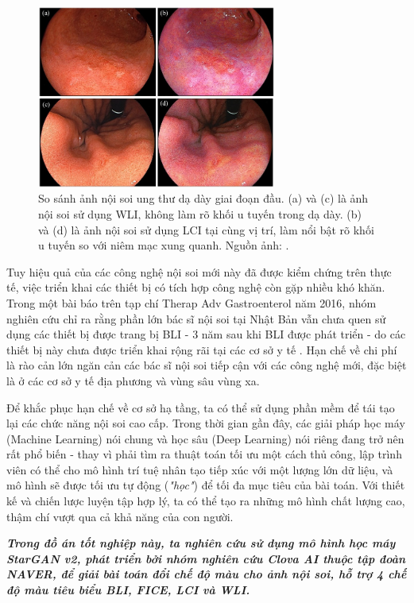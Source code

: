 \documentclass[12pt]{extreport}
\begin{document}
\begin{figure}[H]
    \centering
    \includegraphics[width=0.7\textwidth]{figure1}
    \caption{So sánh ảnh nội soi ung thư dạ dày giai đoạn đầu. (a) và (c) là ảnh nội soi sử dụng WLI, không làm rõ khối u tuyến trong dạ dày. (b) và (d) là ảnh nội soi sử dụng LCI tại cùng vị trí, làm nổi bật rõ khối u tuyến so với niêm mạc xung quanh. Nguồn ảnh: \cite{pmid31700545}.}
    \label{wli-lci}
\end{figure}

Tuy hiệu quả của các công nghệ nội soi mới này đã được kiểm chứng trên thực tế, việc triển khai các thiết bị có tích hợp công nghệ còn gặp nhiều khó khăn. Trong một bài báo trên tạp chí Therap Adv Gastroenterol năm 2016, nhóm nghiên cứu chỉ ra rằng phần lớn bác sĩ nội soi tại Nhật Bản vẫn chưa quen sử dụng các thiết bị được trang bị BLI - 3 năm sau khi BLI được phát triển - do các thiết bị này chưa được triển khai rộng rãi tại các cơ sở y tế \cite{pmid26770267}. Hạn chế về chi phí là rào cản lớn ngăn cản các bác sĩ nội soi tiếp cận với các công nghệ mới, đặc biệt là ở các cơ sở y tế địa phương và vùng sâu vùng xa.

Để khắc phục hạn chế về cơ sở hạ tầng, ta có thể sử dụng phần mềm để tái tạo lại các chức năng nội soi cao cấp. Trong thời gian gần đây, các giải pháp học máy (Machine Learning) nói chung và học sâu (Deep Learning) nói riêng đang trở nên rất phổ biến - thay vì phải tìm ra thuật toán tối ưu một cách thủ công, lập trình viên có thể cho mô hình trí tuệ nhân tạo tiếp xúc với một lượng lớn dữ liệu, và mô hình sẽ được tối ưu tự động (\textit{"học"}) để tối đa mục tiêu của bài toán. Với thiết kế và chiến lược luyện tập hợp lý, ta có thể tạo ra những mô hình chất lượng cao, thậm chí vượt qua cả khả năng của con người.

\textit{\textbf{Trong đồ án tốt nghiệp này, ta nghiên cứu sử dụng mô hình học máy StarGAN v2, phát triển bởi nhóm nghiên cứu Clova AI thuộc tập đoàn NAVER, để giải bài toán đổi chế độ màu cho ảnh nội soi, hỗ trợ 4 chế độ màu tiêu biểu BLI, FICE, LCI và WLI.}}
\end{document}
